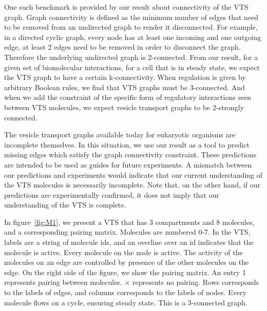 One such benchmark is provided by our result about connectivity of the VTS graph. Graph connectivity is defined as the minimum number of edges that need to be removed from an undirected graph to render it disconnected. For example, in a directed cyclic graph, every node has at least one incoming and one outgoing edge, at least 2 edges need to be removed in order to disconnect the graph. Therefore the underlying undirected graph is 2-connected. 
From our result, for a given set of biomolecular interactions, for a cell that is in steady state, we expect the VTS graph to have a certain k-connectivity. When regulation is given by arbitrary Boolean rules, we find that VTS graphs must be 3-connected. And when we add the constraint of the specific form of regulatory interactions seen between VTS molecules, we expect vesicle transport graphs to be 2-strongly connected.

The vesicle transport graphs available today for eukaryotic organisms are incomplete themselves. 
%
In this situation, we use our result as a tool to predict missing edges which satisfy the graph connectivity constraint. 
%
These predictions are intended to be used as guides for future experiments. 
%
A mismatch between our predictions and experiments would indicate that our current understanding of the VTS molecules is necessarily incomplete. 
%
Note that, on the other hand, if our predictions are experimentally confirmed, it does not imply that our understanding of the VTS is complete.\\
%

\begin{example}
%
In figure~\ref{fig:M1}, we present a VTS that has 3 compartments and 8 molecules, and a corresponding pairing matrix.
%
Molecules are numbered 0-7.
%
In the VTS, labels are a string of molecule ids, and an overline over an id indicates that the molecule is active.
%
Every molecule on the node is active.
%
The activity of the molecules on an edge are controlled
by presence of the other molecules on the edge.
%
On the right side of the figure, we show the pairing matrix.
%
An entry 1 represents pairing between molecules.
%
$\times$ represents no pairing.
%
Rows corresponds to the labels of edges, and
columns corresponds to the labels of nodes.
%
Every molecule flows on a cycle, ensuring steady state.
%
This is a 3-connected graph.
\end{example}
%

\label{subsec:graphmodel}

